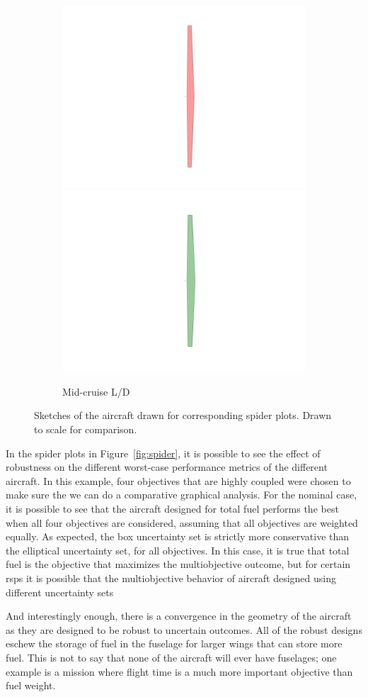 \begin{figure}
\begin{center}
\begin{subfigure}{0.48\linewidth}
            \includegraphics[trim={8cm 1cm 8cm 1cm}, clip, width=0.33\linewidth]{figures/3elliptical.png}\hfill
            \includegraphics[trim={8cm 1cm 8cm 1cm}, clip, width=0.33\linewidth]{figures/3box.png}\hfill
            \caption{Mid-cruise L/D}
        \end{subfigure}\par\medskip
        \caption{Sketches of the aircraft drawn for corresponding spider plots. Drawn to scale for comparison.}
    \end{center}
\end{figure}

In the spider plots in Figure~\ref{fig:spider}, it is possible to see the effect of robustness on
the different worst-case performance metrics of the different aircraft. In this example, four objectives that
are highly coupled were chosen to make sure the we can do a comparative graphical analysis.
For the nominal case, it is possible to see that
the aircraft designed for total fuel performs the best when all four objectives are considered,
assuming that all objectives are weighted equally. As expected,
the box uncertainty set is strictly more conservative than the elliptical uncertainty set, for
all objectives. In this case, it is true that total fuel is the objective that maximizes
the multiobjective outcome, but for certain \gls{rsp}s it is possible that the multiobjective behavior
of aircraft designed using different uncertainty sets

And interestingly enough, there is a convergence in the geometry of the aircraft as they are designed
to be robust to uncertain outcomes. All of the robust designs eschew the storage of fuel in the fuselage
for larger wings that can store more fuel. This is not to say that none of the aircraft will ever have
fuselages; one example is a mission where flight time is a much more important objective
than fuel weight.


